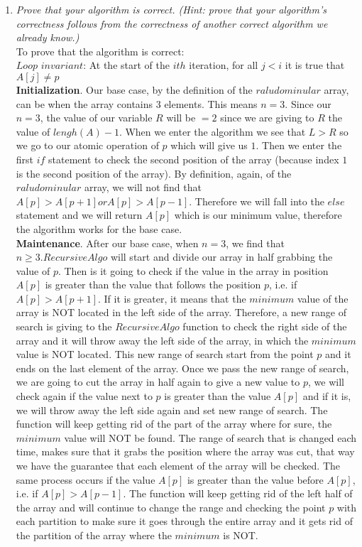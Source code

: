 \documentclass[12pt]{article} \setlength{\oddsidemargin}{0in}
\begin{document}
\begin{enumerate} [label=\textbf{\arabic*}.]
\begin{enumerate}  [label=\textbf{\alph*})]
\begin{verbatim}
\end{verbatim}
    
  \item \textit{Prove that your algorithm is correct. (Hint: prove %
      that your algorithm's correctness follows from the correctness
      of another correct algorithm we already know.)} \\

    To prove that the algorithm is correct:\\
    $Loop$ $invariant$: At the start of the $ith$ iteration, for all $j<i$ it is true that $A[j] \neq p$\\
    \textbf{Initialization}. Our base case, by the definition of the $raludominular$ array, can be when the array contains 3 elements. This means $n=3$. Since our $n=3$, the value of our variable $R$ will be $=2$ since we are giving to $R$ the value of $lengh(A) - 1$. When we enter the algorithm we see that $L>R$ so we go to our atomic operation of $p$ which will give us $1$. Then we enter the first $if$ statement to check the second position of the array (because index $1$ is the second position of the array). By definition, again, of the $raludominular$ array, we will not find that $A[p] > A[p+1] or A[p]>A[p-1]$. Therefore we will fall into the $else$ statement and we will return $A[p]$ which is our minimum value, therefore the algorithm works for the base case. \\
    \textbf{Maintenance}. After our base case, when $n=3$, we find that $n\geqslant 3. RecursiveAlgo$ will start and divide our array in half grabbing the value of $p$. Then is it going to check if the value in the array in position $A[p]$ is greater than the value that follows the position $p$, i.e. if $A[p]>A[p+1]$. If it is greater, it means that the $minimum$ value of the array is NOT located in the left side of the array. Therefore, a new range of search is giving to the $RecursiveAlgo$ function to check the right side of the array and it will throw away the left side of the array, in which the $minimum$ value is NOT located. This new range of search start from the point $p$ and it ends on the last element of the array. Once we pass the new range of search, we are going to cut the array in half again to give a new value to $p$, we will check again if the value next to $p$ is greater than the value $A[p]$ and if it is, we will throw away the left side again and set new range of search. The function will keep getting rid of the part of the array where for sure, the $minimum$ value will NOT be found. The range of search that is changed each time, makes sure that it grabs the position where the array was cut, that way we have the guarantee that each element of the array will be checked. The same process occurs if the value $A[p]$ is greater than the value before  $A[p]$, i.e. if $A[p]>A[p-1]$. The function will keep getting rid of the left half of the array and will continue to change the range and checking the point $p$ with each partition to make sure it goes through the entire array and it gets rid of the partition of the array where the $minimum$ is NOT.\\

\end{enumerate}
\end{enumerate}
\end{document}
